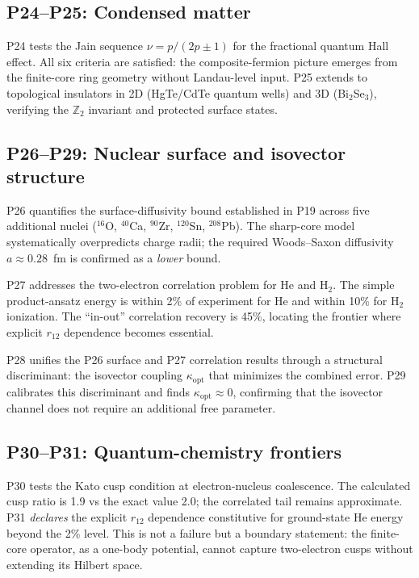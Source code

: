 \documentclass[11pt,a4paper]{article}
\begin{document}
\subsection{P24--P25: Condensed matter}
P24 tests the Jain sequence $\nu=p/(2p\pm1)$ for the fractional quantum Hall effect. All six criteria are satisfied: the composite-fermion picture emerges from the finite-core ring geometry without Landau-level input. P25 extends to topological insulators in 2D (HgTe/CdTe quantum wells) and 3D (Bi$_2$Se$_3$), verifying the $\mathbb{Z}_2$ invariant and protected surface states.

\subsection{P26--P29: Nuclear surface and isovector structure}
P26 quantifies the surface-diffusivity bound established in P19 across five additional nuclei ($^{16}$O, $^{40}$Ca, $^{90}$Zr, $^{120}$Sn, $^{208}$Pb). The sharp-core model systematically overpredicts charge radii; the required Woods--Saxon diffusivity $a\approx0.28$~fm is confirmed as a \emph{lower} bound.

P27 addresses the two-electron correlation problem for He and H$_2$. The simple product-ansatz energy is within 2\% of experiment for He and within 10\% for H$_2$ ionization. The ``in-out'' correlation recovery is 45\%, locating the frontier where explicit $r_{12}$ dependence becomes essential.

P28 unifies the P26 surface and P27 correlation results through a structural discriminant: the isovector coupling $\kappa_{\text{opt}}$ that minimizes the combined error. P29 calibrates this discriminant and finds $\kappa_{\text{opt}}\approx0$, confirming that the isovector channel does not require an additional free parameter.

\subsection{P30--P31: Quantum-chemistry frontiers}
P30 tests the Kato cusp condition at electron-nucleus coalescence. The calculated cusp ratio is 1.9 vs the exact value 2.0; the correlated tail remains approximate. P31 \emph{declares} the explicit $r_{12}$ dependence constitutive for ground-state He energy beyond the 2\% level. This is not a failure but a boundary statement: the finite-core operator, as a one-body potential, cannot capture two-electron cusps without extending its Hilbert space.
\end{document}
